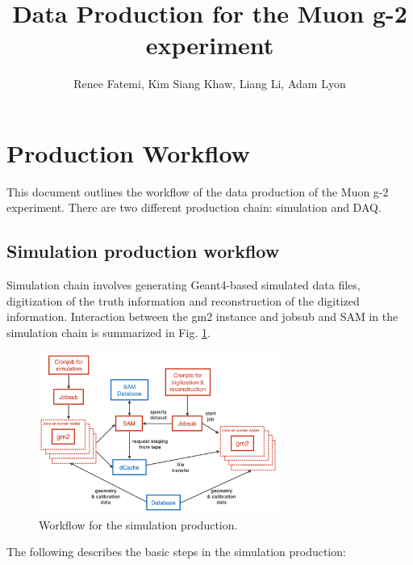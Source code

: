 

\author{Renee Fatemi, Kim Siang Khaw, Liang Li, Adam Lyon}
\title{Data Production for the Muon g-2 experiment}


\maketitle

\section{Production Workflow}
This document outlines the workflow of the data production of the Muon g-2 experiment. There are two different production chain: simulation and DAQ. 

\subsection{Simulation production workflow}
Simulation chain involves generating Geant4-based simulated data files, digitization of the truth information and reconstruction of the digitized information. Interaction between the gm2 instance and jobsub and SAM  in the simulation chain is summarized in Fig. \ref{fig:SimProd}.

\begin{figure}[htbp]
\centering
\includegraphics[width=0.7\textwidth]{pics/SimulationProductionWorkflow.pdf} 
\caption{Workflow for the simulation production.}\label{fig:SimProd}
\end{figure}

The following describes the basic steps in the simulation production:

